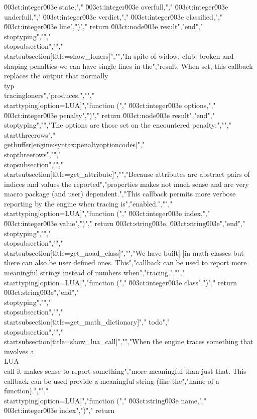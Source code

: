 \u003ct:integer\u003e state,","    \u003ct:integer\u003e overfull,","    \u003ct:integer\u003e underfull,","    \u003ct:integer\u003e verdict,","    \u003ct:integer\u003e classified,","    \u003ct:integer\u003e line",")","    return \u003ct:node\u003e result","end","\\stoptyping","","\\stopsubsection","","\\startsubsection[title=show_loners]","","In spite of widow, club, broken and shaping penalties we can have single lines in the","result. When set, this callback replaces the output that normally \\typ {\\tracingloners}","produces.","","\\starttyping[option=LUA]","function (","    \u003ct:integer\u003e options,","    \u003ct:integer\u003e penalty",")","    return \u003ct:node\u003e result","end","\\stoptyping","","The options are those set on the encountered penalty:","","\\startthreerows","\\getbuffer[engine:syntax:penaltyoptioncodes]","\\stopthreerows","","\\stopsubsection","","\\startsubsection[title=get_attribute]","","Because attributes are abstract pairs of indices and values the reported","properties makes not much sense and are very macro package (and user) dependent.","This callback permits more verbose reporting by the engine when tracing is","enabled.","","\\starttyping[option=LUA]","function (","    \u003ct:integer\u003e index,","    \u003ct:integer\u003e value",")","    return \u003ct:string\u003e, \u003ct:string\u003e","end","\\stoptyping","","\\stopsubsection","","\\startsubsection[title=get_noad_class]","","We have built|-|in math classes but there can also be user defined ones. This","callback can be used to report more meaningful strings instead of numbers when","tracing.","","\\starttyping[option=LUA]","function (","    \u003ct:integer\u003e class",")","    return \u003ct:string\u003e","end","\\stoptyping","","\\stopsubsection","","\\startsubsection[title=get_math_dictionary]","    todo","\\stopsubsection","","\\startsubsection[title=show_lua_call]","","When the engine traces something that involves a \\LUA\\ call it makes sense to report something","more meaningful than just that. This callback can be used provide a meaningful string (like the","name of a function).","","\\starttyping[option=LUA]","function (","    \u003ct:string\u003e  name,","    \u003ct:integer\u003e index",")","    return 